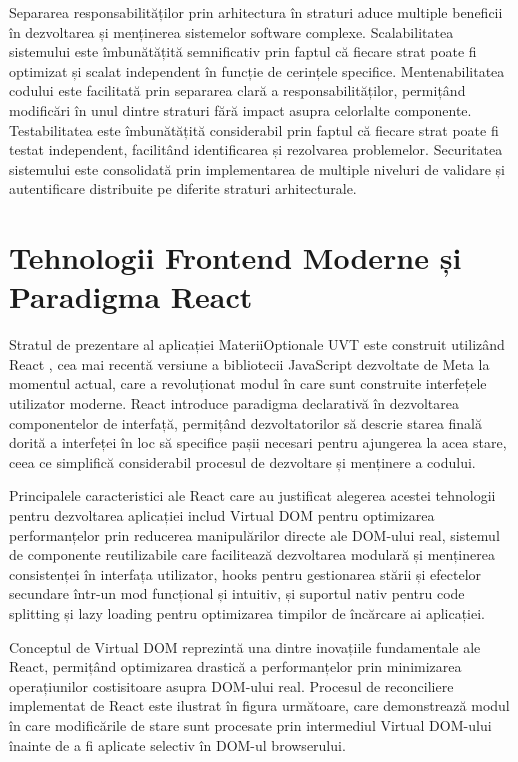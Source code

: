 \documentclass[12pt,a4paper]{report}
\begin{document}
Separarea responsabilităților prin arhitectura în straturi aduce multiple beneficii în dezvoltarea și menținerea sistemelor software complexe. Scalabilitatea sistemului este îmbunătățită semnificativ prin faptul că fiecare strat poate fi optimizat și scalat independent în funcție de cerințele specifice. Mentenabilitatea codului este facilitată prin separarea clară a responsabilităților, permițând modificări în unul dintre straturi fără impact asupra celorlalte componente. Testabilitatea este îmbunătățită considerabil prin faptul că fiecare strat poate fi testat independent, facilitând identificarea și rezolvarea problemelor. Securitatea sistemului este consolidată prin implementarea de multiple niveluri de validare și autentificare distribuite pe diferite straturi arhitecturale.



\section{Tehnologii Frontend Moderne și Paradigma React}

Stratul de prezentare al aplicației MateriiOptionale UVT este construit utilizând React \cite{react-docs}, cea mai recentă versiune a bibliotecii JavaScript \cite{javascript-guide} dezvoltate de Meta la momentul actual, care a revoluționat modul în care sunt construite interfețele utilizator moderne. React introduce paradigma declarativă în dezvoltarea componentelor de interfață, permițând dezvoltatorilor să descrie starea finală dorită a interfeței în loc să specifice pașii necesari pentru ajungerea la acea stare, ceea ce simplifică considerabil procesul de dezvoltare și menținere a codului.

Principalele caracteristici ale React care au justificat alegerea acestei tehnologii pentru dezvoltarea aplicației includ Virtual DOM pentru optimizarea performanțelor prin reducerea manipulărilor directe ale DOM-ului real, sistemul de componente reutilizabile care facilitează dezvoltarea modulară și menținerea consistenței în interfața utilizator, hooks pentru gestionarea stării și efectelor secundare într-un mod funcțional și intuitiv, și suportul nativ pentru code splitting și lazy loading pentru optimizarea timpilor de încărcare ai aplicației.

Conceptul de Virtual DOM reprezintă una dintre inovațiile fundamentale ale React, permițând optimizarea drastică a performanțelor prin minimizarea operațiunilor costisitoare asupra DOM-ului real. Procesul de reconciliere implementat de React este ilustrat în figura următoare, care demonstrează modul în care modificările de stare sunt procesate prin intermediul Virtual DOM-ului înainte de a fi aplicate selectiv în DOM-ul browserului.
\end{document}
